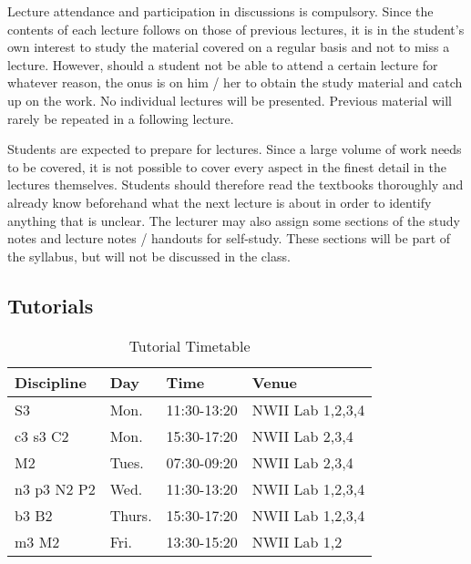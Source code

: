         Lecture attendance and participation in discussions is compulsory.
        Since the contents of each lecture follows on those of previous
        lectures, it is in the student's own interest to study the material
        covered on a regular basis and not to miss a lecture. However, should a
        student not be able to attend a certain lecture for whatever reason,
        the onus is on him / her to obtain the study material and catch up on
        the work. No individual lectures will be presented. Previous material
        will rarely be repeated in a following lecture.

        Students are expected to prepare for lectures. Since a large volume of
        work needs to be covered, it is not possible to cover every aspect in
        the finest detail in the lectures themselves. Students should therefore
        read the textbooks thoroughly and already know beforehand what the next
        lecture is about in order to identify anything that is unclear. The
        lecturer may also assign some sections of the study notes and lecture
        notes / handouts for self-study. These sections will be part of the
        syllabus, but will not be discussed in the class.

    \subsection{Tutorials}
        \begin{table}[!h]
            \begin{center}
            \begin{tabular}{|l|l|l|l|}
                \hline
                {\bf Discipline} & {\bf Day} & {\bf Time} & {\bf Venue} \\
                \hline
                S3          & Mon.   & 11:30-13:20 & NWII Lab 1,2,3,4 \\
                c3 s3 C2    & Mon.   & 15:30-17:20 & NWII Lab 2,3,4 \\
                M2          & Tues.  & 07:30-09:20 & NWII Lab 2,3,4 \\
                n3 p3 N2 P2 & Wed.   & 11:30-13:20 & NWII Lab 1,2,3,4 \\
                b3 B2       & Thurs. & 15:30-17:20 & NWII Lab 1,2,3,4 \\
                m3 M2       & Fri.   & 13:30-15:20 & NWII Lab 1,2 \\
                \hline
            \end{tabular}
            \caption{Tutorial Timetable}
            \label{tab:tutorials}
            \end{center}
        \end{table}

